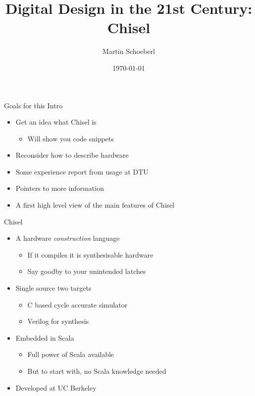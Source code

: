 \documentclass[xcolor=pdflatex,dvipsnames,table]{beamer}
\title{Digital Design in the 21st Century: Chisel}
\author{Martin Schoeberl}
\date{\today}
\institute{DTU Compute}
\begin{document}
\begin{frame}
\titlepage
\end{frame}


\begin{frame}[fragile]{Goals for this Intro}
\begin{itemize}
\item Get an idea what Chisel is
\begin{itemize}
\item Will show you code snippets
\end{itemize}
\item Reconsider how to describe hardware
\item Some experience report from usage at DTU
\item Pointers to more information
\item A first high level view of the main features of Chisel
\end{itemize}
\end{frame}

%
%
%
%

\begin{frame}[fragile]{Chisel}
\begin{itemize}
\item A hardware \emph{construction} language
\begin{itemize}
\item If it compiles it is synthesisable hardware 
\item Say goodby to your unintended latches
\end{itemize}
\item Single source two targets
\begin{itemize}
\item C based cycle accurate simulator
\item Verilog for synthesis
\end{itemize}
\item Embedded in Scala
\begin{itemize}
\item Full power of Scala available
\item But to start with, no Scala knowledge needed
\end{itemize}
\item Developed at UC Berkeley
\end{itemize}
\end{frame}
\end{document}
